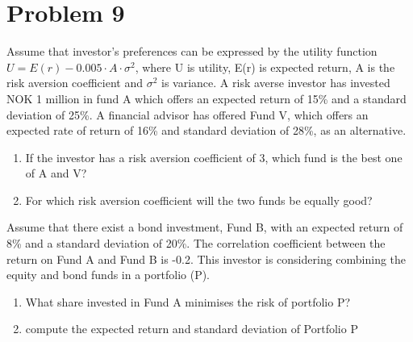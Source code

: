 \documentclass[12]{article}
\begin{document}
\section*{Problem 9}
Assume that investor’s preferences can be expressed by the utility function $U = E(r) - 0.005 \cdot A\cdot \sigma^2$, where U is utility, E(r) is expected return, A is the risk aversion coefficient and $\sigma^2$ is variance.
A risk averse investor has invested NOK 1 million in fund A which offers an expected return of 15\% and a standard deviation of 25\%. A financial advisor has offered Fund V, which offers an expected rate of return of 16\% and standard deviation of 28\%, as an alternative.
\begin{enumerate}
    \item[a)] If the investor has a risk aversion coefficient of 3, which fund is the best one of A and V?
    \item[b)] For which risk aversion coefficient will the two funds be equally good?
\end{enumerate}
Assume that there exist a bond investment, Fund B, with an expected return of 8\% and a standard deviation of 20\%. The correlation coefficient between the return on Fund A and Fund B is -0.2. This investor is considering combining the equity and bond funds in a portfolio (P). 
\begin{enumerate}
    \item[c)] What share invested in Fund A minimises the risk of portfolio P?
    \item[d)] compute the expected return and standard deviation of Portfolio P
\end{enumerate}
\end{document}
